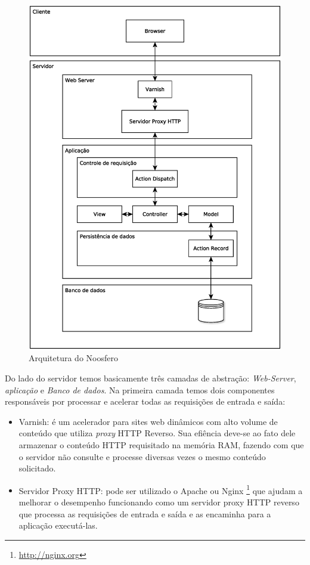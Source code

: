 \begin{figure}[h]
    \centering
    \includegraphics[keepaspectratio=true,scale=0.4]
      {figuras/DiagramaDeArquitetura.eps}
    \caption{Arquitetura do Noosfero}
    \label{arquitetura-noosfero}
\end{figure}

Do lado do servidor temos basicamente três camadas de abstração: \textit{Web-Server}, \textit{aplicação} e \textit{Banco de dados}. Na primeira camada temos dois componentes responsáveis por processar e acelerar todas as requisições de entrada e saída:

\begin{itemize}
\item Varnish: é um acelerador para sites web dinâmicos com alto volume de conteúdo que utiliza \textit{proxy} HTTP Reverso. Sua efiência deve-se ao fato dele armazenar o conteúdo HTTP requisitado na memória RAM, fazendo com que o servidor não consulte e processe diversas vezes o mesmo conteúdo solicitado.
\item Servidor Proxy HTTP: pode ser utilizado o Apache ou Nginx \footnote{\url{http://nginx.org}} que ajudam a melhorar o desempenho funcionando como um servidor proxy HTTP reverso que processa as requisições de entrada e saída e as encaminha para a aplicação executá-las.
\end{itemize}

